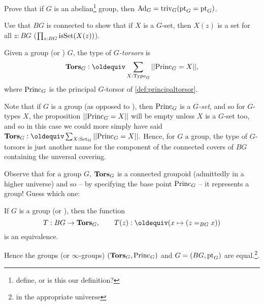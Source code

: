 \begin{xca}
  Prove that if $G$ is an abelian\footnote{define, or is this our definition?} group, then $\mathrm{Ad}_G=\mathrm{triv}_G({\mathord{\mathrm{pt}}}_G={\mathord{\mathrm{pt}}}_G)$.
\end{xca}
\begin{xca}
  Use that $BG$ is connected to show that if $X$ is a $G$-set, then $X(z)$ is a set for all $z:BG$ (\ie $\prod_{z:BG}\mathrm{isSet}(X(z))$).
\end{xca}
\begin{definition}
  Given a group (or \inftygp) $G$, the type of {\em$G$-torsors} is
$$\typetorsor_G\defequi\sum_{X:\Type_G}||\princ_G=X||,$$
where $\mathrm{Princ}_G$ is the principal $G$-torsor of \cref{def:principaltorsor}.
\end{definition}
\begin{remark}
  Note that if $G$ is a group (as opposed to \aninftygp), then $\mathrm{Princ}_G$ is a $G${\em-set}, and so for $G$-types $X$, the proposition $||\mathrm{Princ}_G=X||$ will be empty unless $X$ is a $G$-set too, and so in this case we could more simply have said $\typetorsor_G\defequi\sum_{X:\Set_G}||\princ_G=X||.$  Hence, for $G$ a group, the type of $G$-torsors is just another name for the component of the connected covers of $BG$ containing the unversal covering.

Observe that for a group $G$, $\mathbf{Tors}_G$ is a connected groupoid (admittedly in a higher universe) and so -- by specifying the base point $\mathrm{Princ}_G$ -- it represents a group!  Guess which one:
\end{remark}
\begin{lemma}\label{lem:BGbytorsor}
  If $G$ is a group (or \inftygp), then the function
$$T:BG\to\typetorsor_G,\qquad T(z)\defequi(x\mapsto(z=_{BG}x))$$
is an equivalence.

Hence the groups (or $\infty$-groups) $(\mathbf{Tors}_G,\mathrm{Princ}_G)$ and $G=(BG,{\mathord{\mathrm{pt}}}_G)$ are equal.\footnote{in the appropriate universe}.
\end{lemma}

